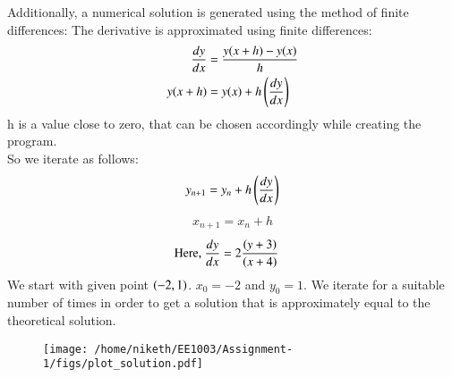\documentclass[journal]{IEEEtran}
\numberwithin{equation}{enumi}
\numberwithin{figure}{enumi}
\begin{document}
Additionally, a numerical solution is generated using the method of finite differences:
The derivative is approximated using finite differences:
	\begin{align*}
    \frac{dy}{dx}&=\frac{y(x+h)-y(x)}{h}\\
    y(x+h)&=y(x)+h\left(\frac{dy}{dx}\right)
	\end{align*}
h is a value close to zero, that can be chosen accordingly while creating the program.\\
So we iterate as follows:
	\begin{align*}
		y_{n+1}=y_{n} + h\left(\frac{dy}{dx}\right)
	\end{align*}
	\begin{align*}
		x_{n+1}=x_{n}+h
	\end{align*}
	\begin{align*}
		\text{Here, } \frac{dy}{dx}&=2\frac{\left(y+3\right)}{\left(x+4\right)}
	\end{align*}
We start with given point $\left(-2,1\right)$. $x_{0}=-2$ and $y_{0}=1$. We iterate for a suitable number of times in order to get a solution that is approximately equal to the theoretical solution.
\begin{figure}[!ht]
    \centering
    \texttt{[image: /home/niketh/EE1003/Assignment-1/figs/plot\_solution.pdf]}
    \caption{}
\end{figure}
\end{document}

